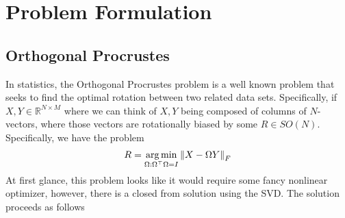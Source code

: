 \documentclass[a4paper]{article}
\DeclareMathOperator*{\argmin}{arg\,min}
\begin{document}
\section*{Problem Formulation}%

\subsection*{Orthogonal Procrustes}%

In statistics, the Orthogonal Procrustes problem is a well known problem that seeks to find the optimal rotation between two related data sets. Specifically, if $X,Y \in \mathds{R}^{N \times M}$ where we can think of $X,Y$ being composed of columns of $N$-vectors, where those vectors are rotationally biased by some $R \in SO(N)$. Specifically, we have the problem
\[
  R = \argmin_{\Omega: \Omega^\top \Omega = I} \norm{X - \Omega Y}_F
\]
At first glance, this problem looks like it would require some fancy nonlinear optimizer, however, there is a closed from solution using the SVD. The solution proceeds as follows
\end{document}
